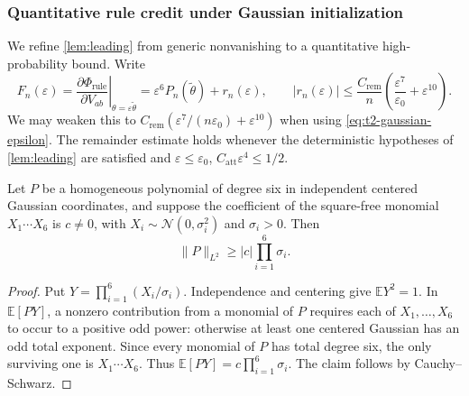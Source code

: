 
\subsubsection*{Quantitative rule credit under Gaussian initialization}
\label{app:t2-gaussian}

We refine \cref{lem:leading} from generic nonvanishing to a quantitative
high-probability bound.  Write
\begin{equation}
 F_n(\varepsilon)=
 \left.\frac{\partial\Phi_{\mathrm{rule}}}{\partial V_{ab}}
 \right|_{\theta=\varepsilon\widetilde\theta}
 =\varepsilon^6P_n(\widetilde\theta)+r_n(\varepsilon),
 \qquad
 |r_n(\varepsilon)|\le\frac{C_{\mathrm{rem}}}{n}
 \left(\frac{\varepsilon^7}{\varepsilon_0}+\varepsilon^{10}\right).
 \label{eq:quant-rule-expansion}
\end{equation}
We may weaken this to $C_{\mathrm{rem}}(\varepsilon^7/(n\varepsilon_0)+\varepsilon^{10})$
when using \cref{eq:t2-gaussian-epsilon}. The remainder estimate holds whenever the deterministic hypotheses of
\cref{lem:leading} are satisfied and
$\varepsilon\le\varepsilon_0$,
$C_{\mathrm{att}}\varepsilon^4\le1/2$.

\begin{lemma}
\label{lem:quant-rule-L2}
Let $P$ be a homogeneous polynomial of degree six in independent centered
Gaussian coordinates, and suppose the coefficient of the square-free
monomial $X_1\cdots X_6$ is $c\ne0$, with
$X_i\sim\mathcal N(0,\sigma_i^2)$ and $\sigma_i>0$.
Then
\begin{equation}
  \|P\|_{L^2}\ge |c|\prod_{i=1}^6\sigma_i.
  \label{eq:quant-rule-L2}
\end{equation}
\end{lemma}
\begin{proof}
Put $Y=\prod_{i=1}^6(X_i/\sigma_i)$.  Independence and centering give
$\mathbb E Y^2=1$.  In $\mathbb E[PY]$, a nonzero contribution from a
monomial of $P$ requires each of $X_1,\ldots,X_6$ to occur to a positive odd
power: otherwise at least one centered Gaussian has an odd total exponent.
Since every monomial of $P$ has total degree six, the only surviving one is
$X_1\cdots X_6$.  Thus
$\mathbb E[PY]=c\prod_{i=1}^6\sigma_i$.
The claim follows by Cauchy--Schwarz.
\end{proof}

